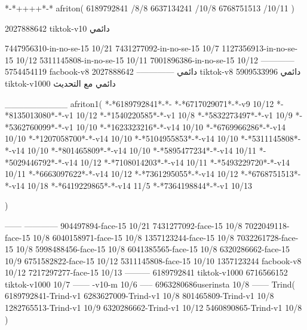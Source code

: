 *-*++++*-*
afriton(
6189792841 /8/8
6637134241 /10/8
6768751513 /10/11
)

2027888642 tiktok-v10
دائمي


7447956310-in-no-se-15 10/21
7431277092-in-no-se-15 10/7
1127356913-in-no-se-15 10/12
5311145808-in-no-se-15 10/11
7001896386-in-no-se-15 10/12
------------
5754454119 facbook-v8
دائمي
--------------
2027888642 tiktok-v8
دائمي
5909533996 tiktok-v1000
دائمي مع التحديث

__________
afriton1(
*-*6189792841*-*-
*-*6717029071*-*-v9 10/12
*-*8135013080‌*-*-v1 10/12
*-*1540220585*-*-v1 10/8
*-*5832273497*-*-v1 10/9
*-*5362760099*-*-v1 10/10
*-*1623323216*-*-v14 10/10
*-*6769966286*-*-v14 10/10
*-*1207058700*-*-v14 10/10
*-*5104955853*-*-v14 10/10
*-*5311145808*-*-v14 10/10
*-*801465809*-*-v14 10/10
*-*5895477234*-*-v14 10/11
*-*5029446792*-*-v14 10/12
*-*7108014203*-*-v14 10/11
*-*5493229720*-*-v14 10/11
*-*6663097622*-*-v14 10/12
*-*7361295055*-*-v14 10/12
*-*6768751513*-*-v14 10/18
*-*6419229865*-*-v14 11/5
*-*7364198844*-*-v1 10/13

)

------
------------
904497894-face-15 10/21
7431277092-face-15 10/8
7022049118-face-15 10/8
6040158971-face-15 10/8
1357123244-face-15 10/8
7032261728-face-15 10/8
5998488456-face-15 10/8
6041385565-face-15 10/8
6320286662-face-15 10/9
6751582822-face-15 10/12
5311145808-face-15 10/10
1357123244 facbook-v8 10/12
7217297277-face-15 10/13
---------
6189792841 tiktok-v1000
6716566152 tiktok-v1000
10/7
------
-v10-m 10/6
-----
6963280686userinsta 10/8
------
Trind(
6189792841-Trind-v1 
6283627009-Trind-v1 10/8
801465809-Trind-v1 10/8
1282765513-Trind-v1 10/9
6320286662-Trind-v1 10/12
5460890865-Trind-v1 10/8
)
